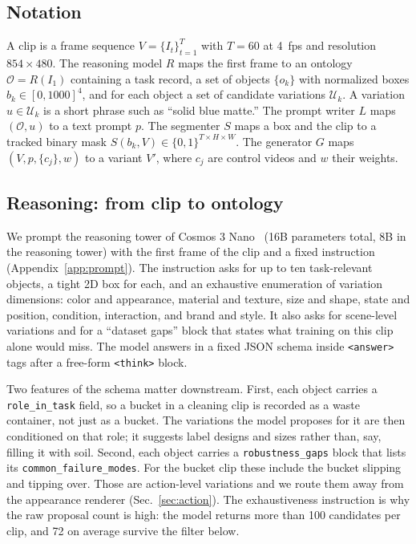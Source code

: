 \subsection{Notation}
A clip is a frame sequence $V=\{I_t\}_{t=1}^{T}$ with $T=60$ at 4~fps and resolution $854\times480$. The reasoning model $R$ maps the first frame to an ontology $\mathcal{O}=R(I_1)$ containing a task record, a set of objects $\{o_k\}$ with normalized boxes $b_k\in[0,1000]^4$, and for each object a set of candidate variations $\mathcal{U}_k$. A variation $u\in\mathcal{U}_k$ is a short phrase such as ``solid blue matte.'' The prompt writer $L$ maps $(\mathcal{O},u)$ to a text prompt $p$. The segmenter $S$ maps a box and the clip to a tracked binary mask $S(b_k,V)\in\{0,1\}^{T\times H\times W}$. The generator $G$ maps $(V,p,\{c_j\},w)$ to a variant $V'$, where $c_j$ are control videos and $w$ their weights.

\subsection{Reasoning: from clip to ontology}
\label{sec:reason}
We prompt the reasoning tower of Cosmos 3 Nano~\cite{cosmos3,cosmos3nano} (16B parameters total, 8B in the reasoning tower) with the first frame of the clip and a fixed instruction (Appendix~\ref{app:prompt}). The instruction asks for up to ten task-relevant objects, a tight 2D box for each, and an exhaustive enumeration of variation dimensions: color and appearance, material and texture, size and shape, state and position, condition, interaction, and brand and style. It also asks for scene-level variations and for a ``dataset gaps'' block that states what training on this clip alone would miss. The model answers in a fixed JSON schema inside \texttt{<answer>} tags after a free-form \texttt{<think>} block.

Two features of the schema matter downstream. First, each object carries a \texttt{role\_in\_task} field, so a bucket in a cleaning clip is recorded as a waste container, not just as a bucket. The variations the model proposes for it are then conditioned on that role; it suggests label designs and sizes rather than, say, filling it with soil. Second, each object carries a \texttt{robustness\_gaps} block that lists its \texttt{common\_failure\_modes}. For the bucket clip these include the bucket slipping and tipping over. Those are action-level variations and we route them away from the appearance renderer (Sec.~\ref{sec:action}). The exhaustiveness instruction is why the raw proposal count is high: the model returns more than 100 candidates per clip, and 72 on average survive the filter below.

